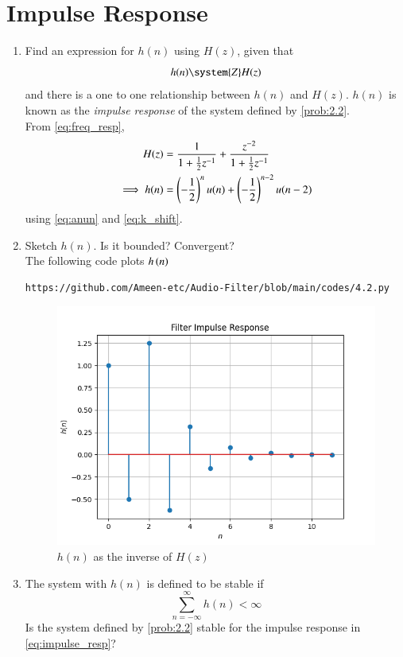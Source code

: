 \documentclass[journal,12pt,twocolumn]{IEEEtran}
\theoremstyle{remark}
\begin{document}
\section{Impulse Response}
\begin{enumerate}[label=\thesection.\arabic*]
\item \label{prob:impulse_resp}
Find an expression for $h(n)$ using $H(z)$, given that 
\begin{equation}
\label{eq:impulse_resp}
h(n) \system{Z} H(z)
\end{equation}
and there is a one to one relationship between $h(n)$ and $H(z)$. $h(n)$ is known as the {\em impulse response} of the
system defined by \eqref{prob:2.2}.
\\
\solution From \eqref{eq:freq_resp},
\begin{align}
H(z) &= \frac{1}{1 + \frac{1}{2}z^{-1}} + \frac{ z^{-2}}{1 + \frac{1}{2}z^{-1}}
\\
\implies h(n) &= \left(-\frac{1}{2}\right)^{n}u(n) + \left(-\frac{1}{2}\right)^{n-2}u(n-2)
\end{align}
using \eqref{eq:anun} and \eqref{eq:k_shift}.
\item Sketch $h(n)$. Is it bounded? Convergent? 
\\
\solution The following code plots $h\left(n\right)$ 
\begin{lstlisting}
https://github.com/Ameen-etc/Audio-Filter/blob/main/codes/4.2.py
\end{lstlisting}
\begin{figure}[h!]
    \centering
    \includegraphics[width=\columnwidth]{figs/hn.png}
    \caption{$h(n)$ as the inverse of $H(z)$}
    \label{fig:hn}
\end{figure}
%
\item The system with $h(n)$ is defined to be stable if
\begin{equation}
\sum_{n=-\infty}^{\infty}h(n) < \infty \label{eq:stable}
\end{equation}
Is the system defined by \eqref{prob:2.2} stable for the impulse response in \eqref{eq:impulse_resp}?\\


\end{enumerate}
\end{document}

